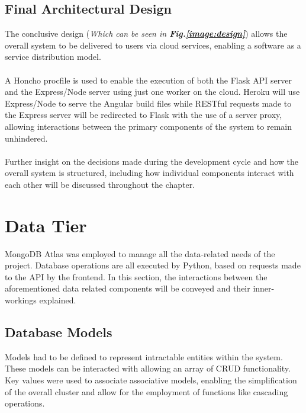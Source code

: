 \subsection{Final Architectural Design}
The conclusive design (\textit{Which can be seen in \textbf{Fig.\ref{image:design}}}) allows the overall system to be delivered to users via cloud services, enabling a software as a service distribution model. 

\paragraph{}
A Honcho procfile is used to enable the execution of both the Flask API server and the Express/Node server using just one worker on the cloud. Heroku will use Express/Node to serve the Angular build files while RESTful requests made to the Express server will be redirected to Flask with the use of a server proxy, allowing interactions between the primary components of the system to remain unhindered.

\paragraph{}
Further insight on the decisions made during the development cycle and how the overall system is structured, including how individual components interact with each other will be discussed throughout the chapter.\newline

\section{Data Tier}
MongoDB Atlas was employed to manage all the data-related needs of the project. Database operations are all executed by Python, based on requests made to the API by the frontend. In this section, the interactions between the aforementioned data related components will be conveyed and their inner-workings explained.

\subsection{Database Models}
Models had to be defined to represent intractable entities within the system. These models can be interacted with allowing an array of CRUD functionality. Key values were used to associate associative models, enabling the simplification of the overall cluster and allow for the employment of functions like cascading operations.

